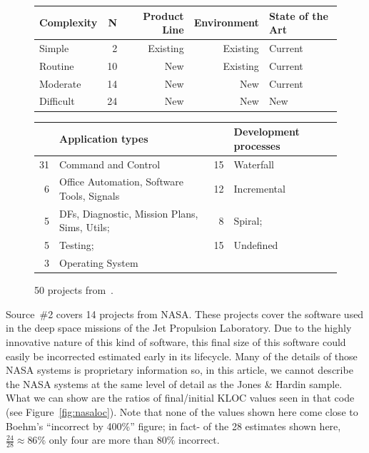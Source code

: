 \documentclass[final,twocolumn]{elsarticle}
\newcommand{\fig}[1]{Figure~\ref{fig:#1}}
\theoremstyle{break}
\begin{document}
\begin{figure}
  \scriptsize
  \begin{center}
      \begin{tabular}{|p{0.5in}|r|r|r|p{0.5in}|}\hline
      Complexity & N &  Product Line  & Environment & State of the Art\\\hline
Simple& 2& Existing& Existing &Current\\
Routine& 10& New& Existing& Current\\
Moderate& 14& New& New& Current\\
Difficult& 24& New& New& New\\\hline
   \end{tabular}

      \vspace{4mm}
      
  \begin{tabular}{|rl|rl|}\hline
        &Application types & &Development processes\\\hline
     31 &Command and Control & 15 &Waterfall\\
    6 &Office Automation, Software Tools, Signals & 12 &Incremental\\
    5 &DFs, Diagnostic, Mission Plans, Sims, Utils; &  8 &Spiral;\\
   5 &Testing; & 15 &Undefined\\
   3 &\multicolumn{3}{l|}{Operating System} \\\hline
  \end{tabular}
  \end{center}
  \caption{50 projects from~\cite{jones07a}.}\label{fig:jones}
  \end{figure}  
Source~\#2 covers 14 projects  from NASA. These projects cover the software used in the deep space
missions of the Jet Propulsion Laboratory. Due to the highly innovative nature of this kind of
software, this final size of this software could easily be incorrected estimated early in its lifecycle.
Many of the details of those NASA systems is proprietary information so, in this article, we cannot describe
the NASA systems at the same level of detail as the Jones \& Hardin sample. What we can show are the ratios
of final/initial KLOC values seen in that code (see \fig{nasaloc}).
 Note
        that none of the values shown here come close to Boehm's ``incorrect by 400\%'' figure;
        in fact- of the 28 estimates shown here, $\frac{24}{28}\approx 86$\%
        only four are more than 80\% incorrect.
\end{document}
